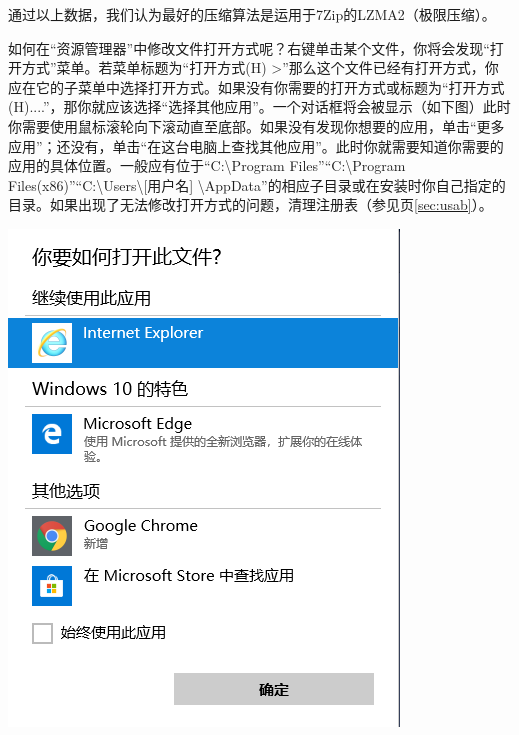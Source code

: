 \documentclass{book}
\begin{document}
通过以上数据，我们认为最好的压缩算法是运用于7Zip的LZMA2（极限压缩）。\par
如何在“资源管理器”中修改文件打开方式呢？右键单击某个文件，你将会发现“打开方式”菜单。若菜单标题为“打开方式(H)    >”那么这个文件已经有打开方式，你应在它的子菜单中选择打开方式。如果没有你需要的打开方式或标题为“打开方式(H)....”，那你就应该选择“选择其他应用”。一个对话框将会被显示（如下图）此时你需要使用鼠标滚轮向下滚动直至底部。如果没有发现你想要的应用，单击“更多应用”；还没有，单击“在这台电脑上查找其他应用”。此时你就需要知道你需要的应用的具体位置。一般应有位于“C:\textbackslash Program Files”“C:\textbackslash Program Files(x86)”“C:\textbackslash Users\textbackslash [用户名] \textbackslash AppData”的相应子目录或在安装时你自己指定的目录。{\color{red}{为了避免这个问题，你需要在安装程序时记下安装位置。}}如果出现了无法修改打开方式的问题，清理注册表（参见\pageref{sec:usab}页\ref{sec:usab}）。
\begin{center}
	\includegraphics[scale=0.5]{pic/htopen}
\end{center}
\end{document}
